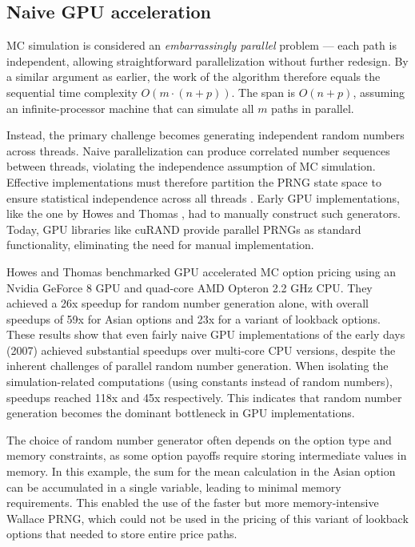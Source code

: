 \documentclass[english,12pt,a4paper,pdftex,sci,utf8]{aaltothesis}
\begin{document}
\subsection{Naive GPU acceleration}
MC simulation is considered an \emph{embarrassingly parallel} problem --- each path is independent, allowing straightforward parallelization without further redesign. By a similar argument as earlier, the work of the algorithm therefore equals the sequential time complexity $O(m \cdot (n+p))$. The span is $O(n+p)$, assuming an infinite-processor machine that can simulate all $m$ paths in parallel.

Instead, the primary challenge becomes generating independent random numbers across threads. Naive parallelization can produce correlated number sequences between threads, violating the independence assumption of MC simulation. Effective implementations must therefore partition the PRNG state space to ensure statistical independence across all threads \cite{gentle2003random}. Early GPU implementations, like the one by Howes and Thomas \cite{nguyen2007gpu}, had to manually construct such generators. Today, GPU libraries like cuRAND \cite{curand2025} provide parallel PRNGs as standard functionality, eliminating the need for manual implementation.

Howes and Thomas \cite{nguyen2007gpu} benchmarked GPU accelerated MC option pricing using an Nvidia GeForce 8 GPU and quad-core AMD Opteron 2.2 GHz CPU. They achieved a 26x speedup for random number generation alone, with overall speedups of 59x for Asian options and 23x for a variant of lookback options. These results show that even fairly naive GPU implementations of the early days (2007) achieved substantial speedups over multi-core CPU versions, despite the inherent challenges of parallel random number generation. When isolating the simulation-related computations (using constants instead of random numbers), speedups reached 118x and 45x respectively. This indicates that random number generation becomes the dominant bottleneck in GPU implementations. 

The choice of random number generator often depends on the option type and memory constraints, as some option payoffs require storing intermediate values in memory. In this example, the sum for the mean calculation in the Asian option can be accumulated in a single variable, leading to minimal memory requirements. This enabled the use of the faster but more memory-intensive Wallace PRNG, which could not be used in the pricing of this variant of lookback options that needed to store entire price paths.
\end{document}
